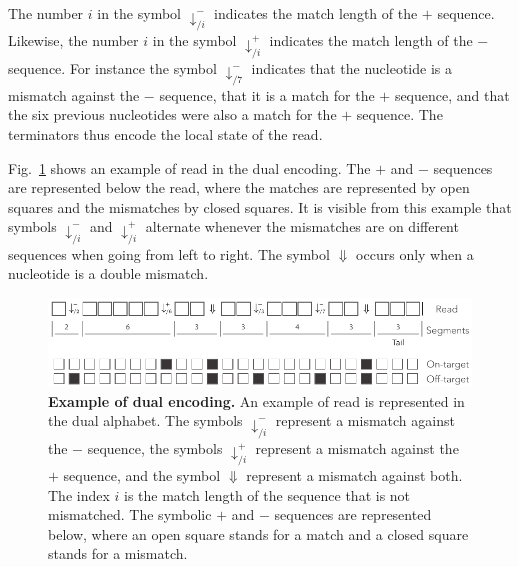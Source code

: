 \documentclass{article}
\begin{document}
The number $i$ in the symbol $\downarrow_{/i}^-$ indicates the match
length of the $+$ sequence. Likewise, the number $i$ in the symbol
$\downarrow_{/i}^+$ indicates the match length of the $-$ sequence. For
instance the symbol $\downarrow_{/7}^-$ indicates that the nucleotide is a
mismatch against the $-$ sequence, that it is a match for the $+$
sequence, and that the six previous nucleotides were also a match for the
$+$ sequence. The terminators thus encode the local state of the read.

Fig.~\ref{fig:dual} shows an example of read in the dual encoding. The $+$
and $-$ sequences are represented below the read, where the matches are
represented by open squares and the mismatches by closed squares. It is
visible from this example that symbols $\downarrow^-_{/i}$ and
$\downarrow^+_{/i}$ alternate whenever the mismatches are on different
sequences when going from left to right. The symbol $\Downarrow$ occurs
only when a nucleotide is a double mismatch.

\begin{figure}[h]
\centering
\includegraphics[scale=0.85]{sketch_dual.pdf}
\caption{\textbf{Example of dual encoding.}
An example of read is represented in the dual alphabet. The symbols
$\downarrow_{/i}^-$ represent a mismatch against the $-$ sequence, the
symbols $\downarrow_{/i}^+$ represent a mismatch against the $+$ sequence,
and the symbol $\Downarrow$ represent a mismatch against both. The index
$i$ is the match length of the sequence that is not mismatched. The
symbolic $+$ and $-$ sequences are represented below, where an open square
stands for a match and a closed square stands for a mismatch.}
\label{fig:dual}
\end{figure}
\end{document}
